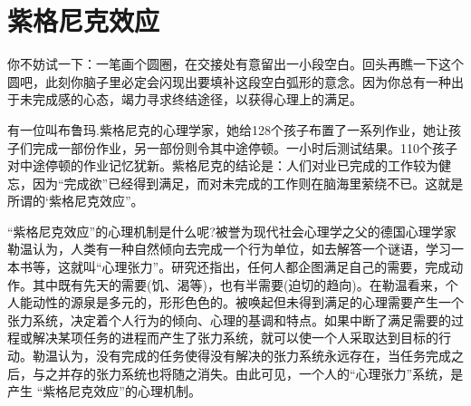 \documentclass[11pt]{ctexart}
\begin{document}
\section{紫格尼克效应}
\label{sec-98}


你不妨试一下：一笔画个圆圈，在交接处有意留出一小段空白。回头再瞧一下这个圆吧，此刻你脑子里必定会闪现出要填补这段空白弧形的意念。因为你总有一种出于未完成感的心态，竭力寻求终结途径，以获得心理上的满足。

有一位叫布鲁玛.紫格尼克的心理学家，她给128个孩子布置了一系列作业，她让孩子们完成一部份作业，另一部份则令其中途停顿。一小时后测试结果。110个孩子对中途停顿的作业记忆犹新。紫格尼克的结论是：人们对业已完成的工作较为健忘，因为“完成欲”已经得到满足，而对未完成的工作则在脑海里萦绕不已。这就是所谓的‘紫格尼克效应”。

“紫格尼克效应”的心理机制是什么呢?被誉为现代社会心理学之父的德国心理学家勒温认为，人类有一种自然倾向去完成一个行为单位，如去解答一个谜语，学习一本书等，这就叫“心理张力”。研究还指出，任何人都企图满足自己的需要，完成动作。其中既有先天的需要(饥、渴等)，也有半需要(迫切的趋向)。在勒温看来，个人能动性的源泉是多元的，形形色色的。被唤起但未得到满足的心理需要产生一个张力系统，决定着个人行为的倾向、心理的基调和特点。如果中断了满足需要的过程或解决某项任务的进程而产生了张力系统，就可以使一个人采取达到目标的行动。勒温认为，没有完成的任务使得没有解决的张力系统永远存在，当任务完成之后，与之并存的张力系统也将随之消失。由此可见，一个人的“心理张力”系统，是产生 “紫格尼克效应”的心理机制。
\end{document}
